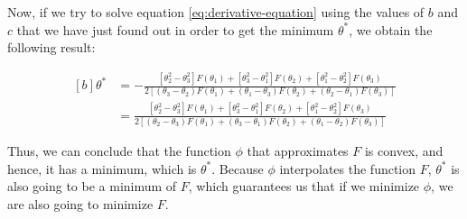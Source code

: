 \documentclass[11pt,a4paper]{article}
\begin{document}
Now, if we try to solve equation \eqref{eq:derivative-equation} using the values of $b$ and $c$ that
we have just found out in order to get the minimum $\theta^*$, we obtain the following result:

\begin{equation*}
  \begin{aligned}[b]
    \theta^*
    &=
    -\frac{
      [\theta_2^2 - \theta_3^2]F(\theta_1) + [\theta_3^2 - \theta_1^2]F(\theta_2) + [\theta_1^2 - \theta_2^2]F(\theta_3)
    }{
      2[(\theta_3 - \theta_2)F(\theta_1) + (\theta_1 - \theta_3)F(\theta_2) + (\theta_2 - \theta_1)F(\theta_3)]
    } \\
    &= \frac{
      [\theta_2^2 - \theta_3^2]F(\theta_1) + [\theta_3^2 - \theta_1^2]F(\theta_2) + [\theta_1^2 - \theta_2^2]F(\theta_3)
    }{
      2[(\theta_2 - \theta_3)F(\theta_1) + (\theta_3 - \theta_1)F(\theta_2) + (\theta_1 - \theta_2)F(\theta_3)]
    }  
  \end{aligned}
\end{equation*}

Thus, we can conclude that the function $\phi$ that approximates $F$ is convex, and hence, it has a minimum, which
is $\theta^*$. Because $\phi$ interpolates the function $F$, $\theta^*$ is also going to be a minimum
of $F$, which guarantees us that if we minimize $\phi$, we are also going to minimize $F$.
\end{document}
